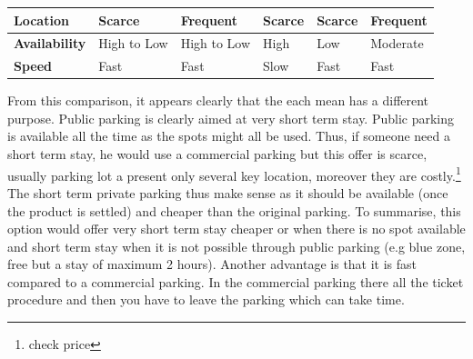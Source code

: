 \documentclass[12pt,a4paper,oneside]{book}
\begin{document}
\begin{table}[h]
\begin{tabular}{l|l|l|l|l|l|}
\multicolumn{1}{|l|}{\textbf{Location}}     & Scarce                             & Frequent                                                     & Scarce                                                                                                      & Scarce                                                                                                             & Frequent                                                                                                            \\ \hline
\multicolumn{1}{|l|}{\textbf{Availability}} & High to Low                        & High to Low                                                  & High                                                                                                        & Low                                                                                                                & Moderate                                                                                                            \\ \hline
\multicolumn{1}{|l|}{\textbf{Speed}}        & Fast                               & Fast                                                         & Slow                                                                                                        & Fast                                                                                                               & Fast                                                                                                                \\ \hline
\end{tabular}
\end{table}

From this comparison, it appears clearly that the each mean has a different purpose. Public parking is clearly aimed at very short term stay. Public parking is available all the time as the spots might all be used. Thus, if someone need a short term stay, he would use a commercial parking but this offer is scarce, usually parking lot a present only several key location, moreover they are costly.\footnote{check price} The short term private parking thus make sense as it should be available (once the product is settled) and cheaper than the original parking. To summarise, this option would offer very short term stay cheaper or when there is no spot available and short term stay when it is not possible through public parking (e.g blue zone, free but a stay of maximum 2 hours). Another advantage is that it is fast compared to a commercial parking. In the commercial parking there all the ticket procedure and then you have to leave the parking which can take time.\\
\end{document}
